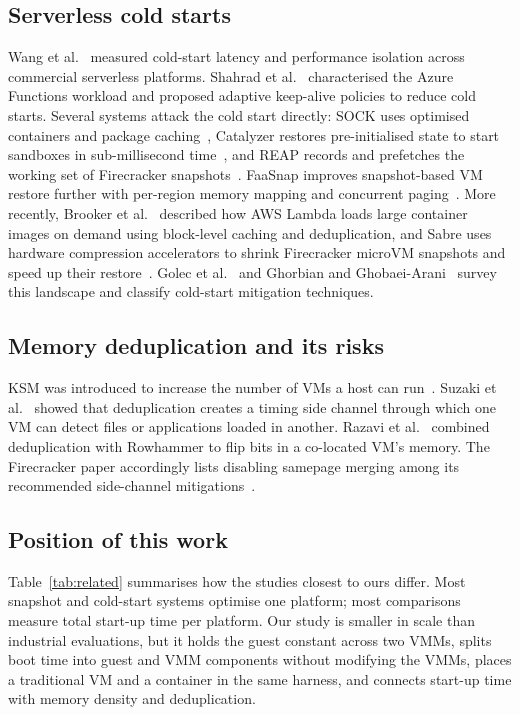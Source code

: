 \documentclass[pdflatex,sn-mathphys-num]{sn-jnl}%
\begin{document}
\subsection{Serverless cold starts}

Wang et al.~\cite{wang2018peeking} measured cold-start latency and performance isolation across commercial serverless platforms. Shahrad et al.~\cite{shahrad2020wild} characterised the Azure Functions workload and proposed adaptive keep-alive policies to reduce cold starts. Several systems attack the cold start directly: SOCK uses optimised containers and package caching~\cite{oakes2018sock}, Catalyzer restores pre-initialised state to start sandboxes in sub-millisecond time~\cite{du2020catalyzer}, and REAP records and prefetches the working set of Firecracker snapshots~\cite{ustiugov2021reap}. FaaSnap improves snapshot-based VM restore further with per-region memory mapping and concurrent paging~\cite{ao2022faasnap}. More recently, Brooker et al.~\cite{brooker2023ondemand} described how AWS Lambda loads large container images on demand using block-level caching and deduplication, and Sabre uses hardware compression accelerators to shrink Firecracker microVM snapshots and speed up their restore~\cite{lazarev2024sabre}. Golec et al.~\cite{golec2024coldstart} and Ghorbian and Ghobaei-Arani~\cite{ghorbian2024survey} survey this landscape and classify cold-start mitigation techniques.

\subsection{Memory deduplication and its risks}

KSM was introduced to increase the number of VMs a host can run~\cite{arcangeli2009ksm}. Suzaki et al.~\cite{suzaki2011dedup} showed that deduplication creates a timing side channel through which one VM can detect files or applications loaded in another. Razavi et al.~\cite{razavi2016ffs} combined deduplication with Rowhammer to flip bits in a co-located VM's memory. The Firecracker paper accordingly lists disabling samepage merging among its recommended side-channel mitigations~\cite{agache2020firecracker}.

\subsection{Position of this work}

Table~\ref{tab:related} summarises how the studies closest to ours differ. Most snapshot and cold-start systems optimise one platform; most comparisons measure total start-up time per platform. Our study is smaller in scale than industrial evaluations, but it holds the guest constant across two VMMs, splits boot time into guest and VMM components without modifying the VMMs, places a traditional VM and a container in the same harness, and connects start-up time with memory density and deduplication.
\end{document}
